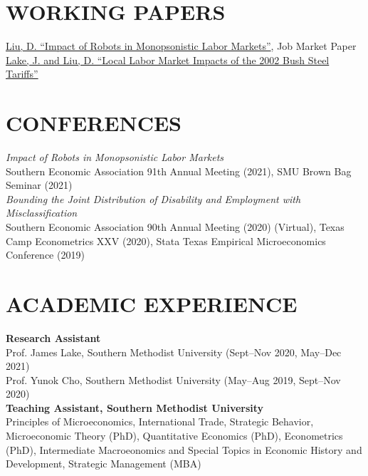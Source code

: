 \documentclass[11pt]{res}
\begin{document}
\begin{resume}
\section{WORKING PAPERS}\vspace{2mm}
\href{https://econdingliu.weebly.com/uploads/1/2/9/0/129022969/dl_jmp_combined_v4.pdf}{Liu, D. ``Impact of Robots in Monopsonistic Labor Markets''}, Job Market Paper\\
\href{https://econdingliu.weebly.com/uploads/1/2/9/0/129022969/bushtariffs.pdf}{Lake, J. and Liu, D. ``Local Labor Market Impacts of the 2002 Bush Steel Tariffs''}


\section{CONFERENCES}\vspace{2mm}
\emph{Impact of Robots in Monopsonistic Labor Markets}\\ 
Southern Economic Association 91th Annual Meeting (2021), SMU Brown Bag Seminar (2021)\vspace{2mm}\\
\emph{Bounding the Joint Distribution of Disability and Employment with Misclassification}\\
Southern Economic Association 90th Annual Meeting (2020) (Virtual),
Texas Camp Econometrics XXV (2020), Stata Texas Empirical Microeconomics Conference (2019)


\section{ACADEMIC EXPERIENCE}\vspace{2mm}
{\bf Research Assistant}\vspace{2mm}\\
Prof. James Lake, Southern Methodist University (Sept--Nov 2020, May--Dec 2021)\\
Prof. Yunok Cho, Southern Methodist University (May--Aug 2019, Sept--Nov 2020)\vspace{2mm}\\
{\bf Teaching Assistant, Southern Methodist University}\vspace{2mm}\\
Principles of Microeconomics, International Trade, Strategic Behavior, Microeconomic Theory (PhD), Quantitative Economics (PhD), Econometrics (PhD), Intermediate Macroeonomics and Special Topics in Economic History and Development, Strategic Management (MBA)


\end{resume}
\end{document}
